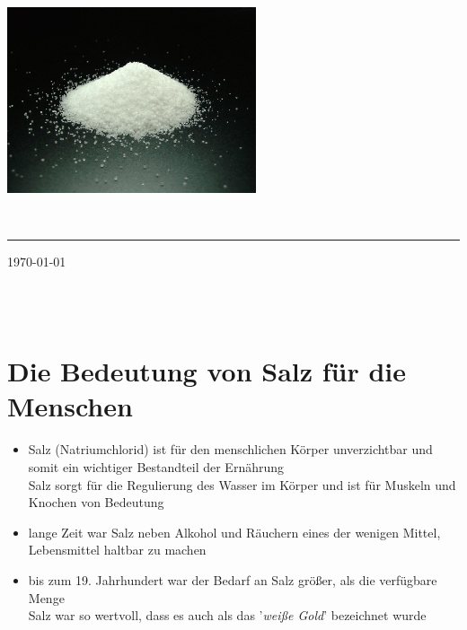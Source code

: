 \documentclass[11pt,a4paper]{article}
\begin{document}
\sffamily   %
\hfill%
\begin{minipage}[t]{.6\textwidth}
\raggedleft%
\includegraphics[width=0.55\textwidth]{Speisesalz.jpg}


\end{minipage}\\[0.5em]
%
{\color{firstnamecolor}\rule{\textwidth}{.25ex}}
%
\begin{minipage}[t]{.4\textwidth}
	\raggedright%
	\vspace*{1em}
	\small%
\end{minipage}
%
\hfill
%
\begin{minipage}[t]{.4\textwidth}
	\raggedleft %
	\today
\end{minipage}\\[2.2em]


{\bfseries {}}\\[0.75em]

\section*{\textsf{Die Bedeutung von Salz für die Menschen}}

\begin{itemize}
\item Salz (Natriumchlorid) ist für den menschlichen Körper unverzichtbar und somit ein wichtiger Bestandteil der Ernährung\\
 Salz sorgt für die Regulierung des Wasser im Körper und ist für Muskeln und Knochen von Bedeutung

\item lange Zeit war Salz neben Alkohol und Räuchern eines der wenigen Mittel, Lebensmittel haltbar zu machen

\item bis zum 19. Jahrhundert war der Bedarf an Salz größer, als die verfügbare Menge\\
 Salz war so wertvoll, dass es auch als das '\textsl{weiße Gold}' bezeichnet wurde


\end{itemize}
\end{document}
